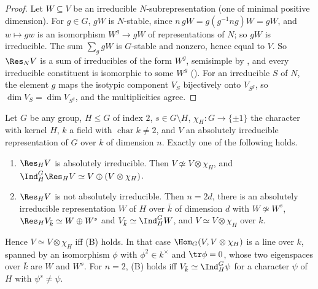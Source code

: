 \begin{proof}
Let $W\subseteq V$ be an irreducible $N$-subrepresentation (one of minimal positive dimension). For $g\in G$, $gW$ is $N$-stable, since
$n\,gW=g(g^{-1}ng)W=gW$, and $w\mapsto gw$ is an isomorphism $W^g\to gW$ of representations of $N$; so $gW$ is irreducible. The sum $\sum_ggW$ is
$G$-stable and nonzero, hence equal to $V$. So $\Res_NV$ is a sum of irreducibles of the form $W^g$, semisimple by , and
every irreducible constituent is isomorphic to some $W^g$ (). For an irreducible $S$ of $N$, the element $g$ maps the
isotypic component $V_S$ bijectively onto $V_{S^g}$, so $\dim V_S=\dim V_{S^g}$, and the multiplicities agree.
\end{proof}

\begin{theorem}\label{thm:reps:clifford-index-two}
Let $G$ be any group, $H\le G$ of index $2$, $s\in G\setminus H$, $\chi_H\colon G\to\{\pm1\}$ the character with kernel $H$, $k$ a field with
$\operatorname{char}k\ne2$, and $V$ an absolutely irreducible representation of $G$ over $k$ of dimension $n$. Exactly one of the following holds.
\begin{enumerate}[label=(\Alph*)]
\item $\Res_HV$ is absolutely irreducible. Then $V\not\simeq V\otimes\chi_H$, and $\Ind_H^G\Res_HV\simeq V\oplus(V\otimes\chi_H)$.
\item $\Res_HV$ is not absolutely irreducible. Then $n=2d$, there is an absolutely irreducible representation $W$ of $H$ over $\bar k$ of
dimension $d$ with $W\not\simeq W^s$, $\Res_HV_{\bar k}\simeq W\oplus W^s$ and $V_{\bar k}\simeq\Ind_H^GW$, and $V\simeq V\otimes\chi_H$ over $k$.
\end{enumerate}
Hence $V\simeq V\otimes\chi_H$ iff (B) holds. In that case $\Hom_G(V,V\otimes\chi_H)$ is a line over $k$, spanned by an isomorphism $\phi$ with
$\phi^2\in k^\times$ and $\tr\phi=0$, whose two eigenspaces over $\bar k$ are $W$ and $W^s$. For $n=2$, (B) holds iff $V_{\bar k}\simeq\Ind_H^G\psi$ for a
character $\psi$ of $H$ with $\psi^s\ne\psi$.
\end{theorem}

